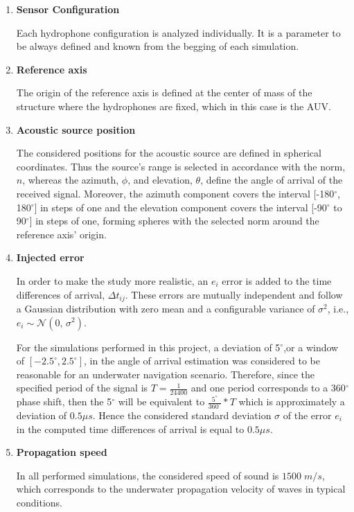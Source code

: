 \begin{enumerate}[label=\alph*)]
	\item \textbf{Sensor Configuration}  
	
	Each hydrophone configuration is analyzed individually. It is a parameter to be always defined and known from the begging of each simulation.
	
	\item \textbf{Reference axis}
	
	 The origin of the reference axis is defined at the center of mass of the structure where the hydrophones are fixed, which in this case is the AUV.
	
	\item \textbf{Acoustic source position} 
	
	The considered positions for the acoustic source are defined in spherical coordinates. Thus the source's range is selected in accordance with the norm, $n$, whereas the azimuth, $\phi$, and elevation, $\theta$, define the angle of arrival of the received signal. Moreover, the azimuth component covers the interval [-180$^{\circ}$, 180$^{\circ}$] in steps of one and the elevation component covers the interval [-90$^{\circ}$ to 90$^{\circ}$] in steps of one, forming spheres with the selected norm around the reference axis' origin.

	\item \textbf{Injected error} 
	
	In order to make the study more realistic, an $e_i$ error is added to the time differences of arrival, $ \Delta t_{ij}$. These errors are mutually independent and follow a Gaussian distribution with zero mean and a configurable variance of $\sigma^{2}$, i.e., $e_i \sim \mathcal{N}(0,\,\sigma^{2})$. 
	
	 For the simulations performed in this project, a deviation of 5$^{\circ}$,or a window of $[-2.5^{\circ},2.5^{\circ}]$, in the angle of arrival estimation was considered to be reasonable for an underwater navigation scenario. Therefore, since the specified period of the signal is $T = \frac{1}{24400}$ and one period corresponds to a 360$^{\circ}$ phase shift, then the 5$^{\circ}$ will be equivalent to $\frac{5^{\circ}}{360^{\circ}}*T$ which is approximately a deviation of $0.5\mu s$. Hence the considered standard deviation $\sigma$ of the error $e_i$ in the computed time differences of arrival is equal to $0.5\mu s$.

	\item \textbf{Propagation speed}
	
	In all performed simulations, the considered speed of sound is $1500 \; m/s$, which corresponds to the underwater propagation velocity of waves in typical conditions.
	
\end{enumerate}

